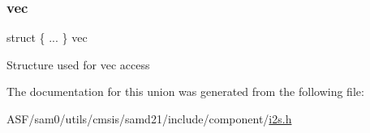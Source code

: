 \subsubsection{\texorpdfstring{vec}{vec}}
{\footnotesize\ttfamily struct \{ ... \}   vec}

Structure used for vec access 

The documentation for this union was generated from the following file\+:\begin{DoxyCompactItemize}
\item 
A\+S\+F/sam0/utils/cmsis/samd21/include/component/\mbox{\hyperlink{component_2i2s_8h}{i2s.\+h}}\end{DoxyCompactItemize}

